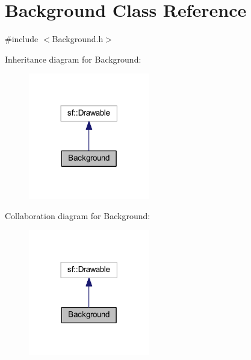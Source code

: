 \hypertarget{class_background}{}\section{Background Class Reference}
\label{class_background}


{\ttfamily \#include $<$Background.\+h$>$}



Inheritance diagram for Background\+:\nopagebreak
\begin{figure}[H]
\begin{center}
\leavevmode
\includegraphics[width=150pt]{class_background__inherit__graph}
\end{center}
\end{figure}


Collaboration diagram for Background\+:\nopagebreak
\begin{figure}[H]
\begin{center}
\leavevmode
\includegraphics[width=150pt]{class_background__coll__graph}
\end{center}
\end{figure}
